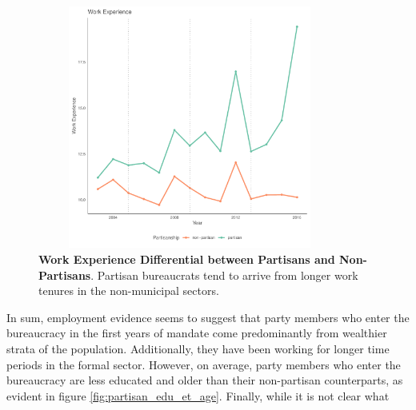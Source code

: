 \begin{figure}[H]
    \centering
    \includegraphics[width = 10cm, height = 8cm]{chapters/chapter_3/figures/partisanship/plot_work_experience_mean.pdf}
    \caption{\textbf{Work Experience Differential between Partisans and Non-Partisans}. Partisan bureaucrats tend to arrive from longer work tenures in the non-municipal sectors.}
    \label{fig:work_experience}
\end{figure}

In sum, employment evidence seems to suggest that party members who enter the bureaucracy in the first years of mandate come predominantly from wealthier strata of the population. Additionally, they have been working for longer time periods in the formal sector. However, on average, party members who enter the bureaucracy are less educated and older than their non-partisan counterparts, as evident in figure \ref{fig:partisan_edu_et_age}. Finally, while it is not clear what 

